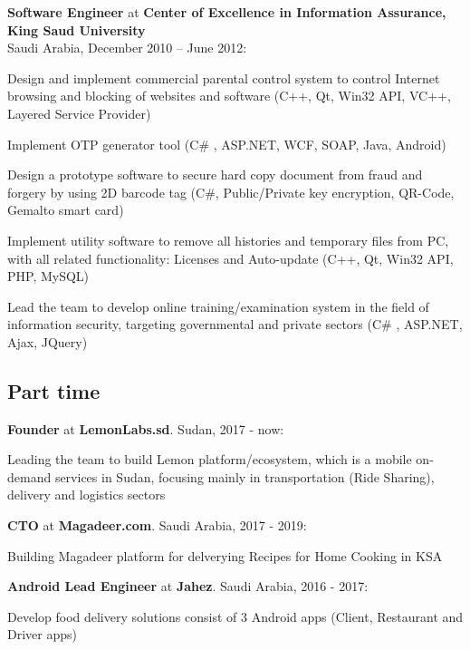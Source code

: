 \documentclass[letterpaper]{article}
\renewenvironment{itemize}{
  \begin{list}{}{
    \setlength{\leftmargin}{1.5em}
  }
}{
  \end{list}
}
\begin{document}
\begin{itemize}
\item \textbf{Software Engineer} at \textbf{Center of Excellence in Information Assurance, King Saud University} \\ Saudi Arabia, December 2010 -- June 2012:
\begin{itemize}
\item Design and implement commercial parental control system to control Internet browsing and blocking of websites and software (C++, Qt, Win32 API, VC++, Layered Service Provider)
\item Implement OTP generator tool (C\# , ASP.NET, WCF, SOAP, Java, Android)
\item Design a prototype software to secure hard copy document from fraud and forgery by using 2D barcode tag (C\#, Public/Private key encryption, QR-Code, Gemalto smart card)
\item Implement utility software to remove all histories and temporary files from PC, with all related functionality: Licenses and Auto-update (C++, Qt, Win32 API, PHP, MySQL)
\item Lead the team to develop online training/examination system in the field of information security, targeting governmental and private sectors (C\# , ASP.NET, Ajax, JQuery)
\end{itemize}

\end{itemize}

\subsection*{Part time}
\begin{itemize}

\item \textbf{Founder} at \textbf{LemonLabs.sd}. Sudan, 2017 - now:
\begin{itemize}
\item Leading the team to build Lemon platform/ecosystem, which is a mobile on-demand services in Sudan, focusing mainly in transportation (Ride Sharing), delivery and logistics sectors
\end{itemize}

\item \textbf{CTO} at \textbf{Magadeer.com}. Saudi Arabia, 2017 - 2019:
\begin{itemize}
\item Building Magadeer platform for delverying Recipes for Home Cooking in KSA
\end{itemize}


\item \textbf{Android Lead Engineer} at \textbf{Jahez}. Saudi Arabia, 2016 - 2017:
\begin{itemize}
\item Develop food delivery solutions consist of 3 Android apps (Client, Restaurant and Driver apps) 
\end{itemize}

\end{itemize}
\end{document}
